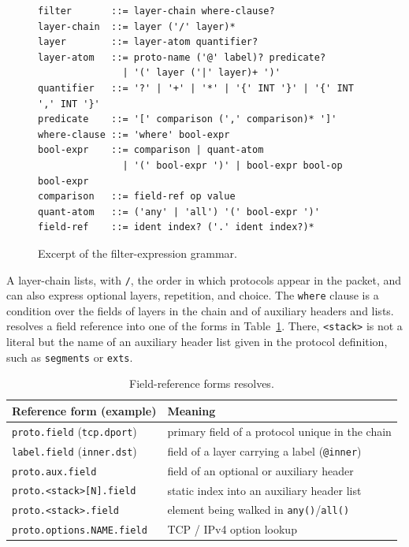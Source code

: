 \begin{figure}[t]
\begin{lstlisting}[basicstyle=\scriptsize\ttfamily,breaklines=true,columns=fullflexible]
filter       ::= layer-chain where-clause?
layer-chain  ::= layer ('/' layer)*
layer        ::= layer-atom quantifier?
layer-atom   ::= proto-name ('@' label)? predicate?
               | '(' layer ('|' layer)+ ')'
quantifier   ::= '?' | '+' | '*' | '{' INT '}' | '{' INT ',' INT '}'
predicate    ::= '[' comparison (',' comparison)* ']'
where-clause ::= 'where' bool-expr
bool-expr    ::= comparison | quant-atom
               | '(' bool-expr ')' | bool-expr bool-op bool-expr
comparison   ::= field-ref op value
quant-atom   ::= ('any' | 'all') '(' bool-expr ')'
field-ref    ::= ident index? ('.' ident index?)*
\end{lstlisting}
\caption{Excerpt of the \kunai filter-expression grammar.}
\label{fig:grammar}
\end{figure}

A layer-chain lists, with \texttt{/}, the order in which protocols
appear in the packet, and can also express optional layers,
repetition, and choice. The \texttt{where} clause is a condition over
the fields of layers in the chain and of auxiliary headers and lists.
\kunai resolves a field reference into one of the forms in
Table~\ref{tab:fieldref}. There, \texttt{<stack>} is not a literal but
the name of an auxiliary header list given in the protocol definition,
such as \texttt{segments} or \texttt{exts}.

\begin{table}[htbp]
  \centering\footnotesize
  \setlength{\tabcolsep}{4pt}
  \begin{tabular}{@{}ll@{}}
    \toprule
    Reference form (example) & Meaning \\
    \midrule
    \texttt{proto.field} (\texttt{tcp.dport}) & primary field of a protocol unique in the chain \\
    \texttt{label.field} (\texttt{inner.dst}) & field of a layer carrying a label (\texttt{@inner}) \\
    \texttt{proto.aux.field} & field of an optional or auxiliary header \\
    \texttt{proto.<stack>[N].field} & static index into an auxiliary header list \\
    \texttt{proto.<stack>.field} & element being walked in \texttt{any()}/\texttt{all()} \\
    \texttt{proto.options.NAME.field} & TCP / IPv4 option lookup \\
    \bottomrule
  \end{tabular}
  \caption{Field-reference forms \kunai resolves.}
  \label{tab:fieldref}
\end{table}

